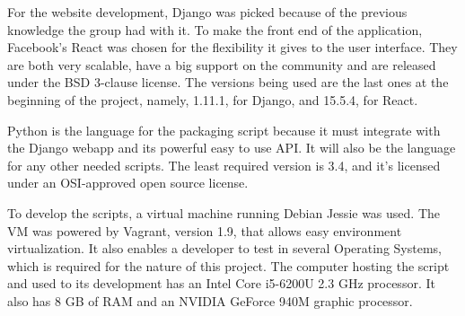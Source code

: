 For the website development, Django was picked because of the previous knowledge the group had with it. To make the front end of the application, Facebook's React was chosen for the flexibility it gives to the user interface. They are both very scalable, have a big support on the community and are released under the BSD 3-clause license. The versions being used are the last ones at the beginning of the project, namely, 1.11.1, for Django, and 15.5.4, for React.

Python is the language for the packaging script because it must integrate with the Django webapp and its powerful easy to use API. It will also be the language for any other needed scripts. The least required version is 3.4, and it's licensed under an OSI-approved open source license.

To develop the scripts, a virtual machine running Debian Jessie was used. The VM was powered by Vagrant, version 1.9, that allows easy environment virtualization. It also enables a developer to test in several Operating Systems, which is required for the nature of this project. The computer hosting the script and used to its development has an Intel Core i5-6200U 2.3 GHz processor. It also has 8 GB of RAM and an NVIDIA GeForce 940M graphic processor.
